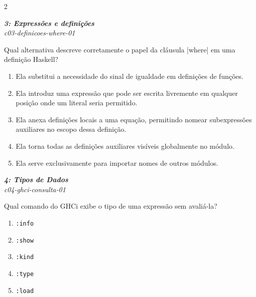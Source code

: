 \documentclass[a4paper,10pt,brazil]{article}
\begin{document}
\begin{multicols}{2}
\begin{flushright}
  \footnotesize
  \textit{\textbf{3: Expressões e definições}}\\
  \textit{c03-definicoes-where-01}\\

\end{flushright}
Qual alternativa descreve corretamente o papel da cláusula \haskellinline|where| em uma definição Haskell?

\begin{enumerate}
  \item Ela substitui a necessidade do sinal de igualdade em definições de funções.

  \item Ela introduz uma expressão que pode ser escrita livremente em qualquer posição onde um literal seria permitido.

  \item Ela anexa definições locais a uma equação, permitindo nomear subexpressões auxiliares no escopo dessa definição.

  \item Ela torna todas as definições auxiliares visíveis globalmente no módulo.

  \item Ela serve exclusivamente para importar nomes de outros módulos.


\end{enumerate}

\begin{flushright}
  \footnotesize
  \textit{\textbf{4: Tipos de Dados}}\\
  \textit{c04-ghci-consulta-01}\\

\end{flushright}
Qual comando do GHCi exibe o tipo de uma expressão sem avaliá-la?

\begin{enumerate}
  \item \texttt{:info}

  \item \texttt{:show}

  \item \texttt{:kind}

  \item \texttt{:type}

  \item \texttt{:load}



\end{enumerate}
\end{multicols}
\end{document}
